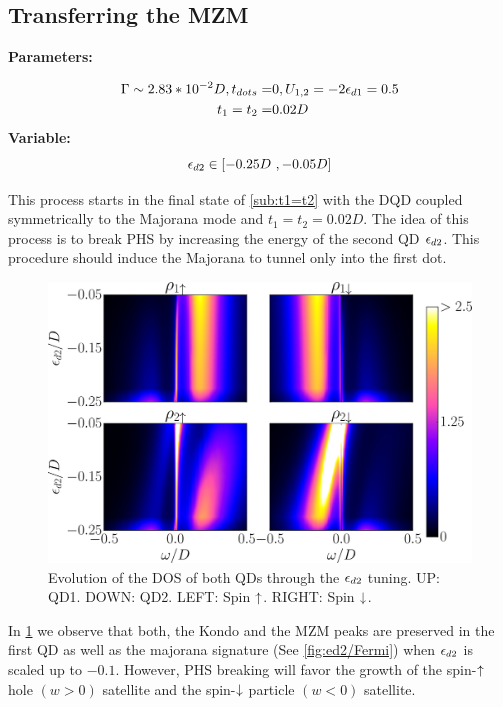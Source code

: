 \documentclass[showpacs,aps,prb,reprint,superscriptaddress]{revtex4-1}
\begin{document}
\subsection{Transferring the MZM \label{sec:e2}}

\textbf{Parameters:}

\begin{align*}
    \Gamma \sim 2.83*10^{-2}D, t_{dots}= & 0 , U_{1,2} = -2\epsilon_{d1} = 0.5 \\
    t_1=t_2=&0.02D
\end{align*}
\textbf{Variable:}
$$\epsilon_{d2} \in [-0.25D \  , -0.05D]$$

This process starts in the final state of \ref{sub:t1=t2} with the DQD coupled symmetrically to the Majorana mode and $t_1=t_2=0.02D$. The idea of this process is to break PHS by increasing the energy of the second QD $\epsilon_{d2}$. This procedure should induce the Majorana to tunnel only into the first dot. \\


\begin{figure}[bt]
\centering
\includegraphics[scale=0.3]{Graficos/2Dhigh.png}
\caption{\label{fig:2D/Shift_ed2} Evolution of the DOS of both QDs through the $\epsilon_{d2}$ tuning. UP: QD1. DOWN: QD2. LEFT: Spin $\uparrow$. RIGHT: Spin $\downarrow$.}
\end{figure}


In \ref{fig:2D/Shift_ed2} we observe that both, the Kondo and the MZM peaks are preserved in the first QD as well as the majorana signature (See \ref{fig:ed2/Fermi}) when $\epsilon_{d2}$ is scaled up to $-0.1$.  However,  PHS breaking will favor the growth of the spin-$\uparrow$ hole $(w>0)$  satellite and the spin-$\downarrow$ particle $(w<0)$ satellite.
\end{document}
